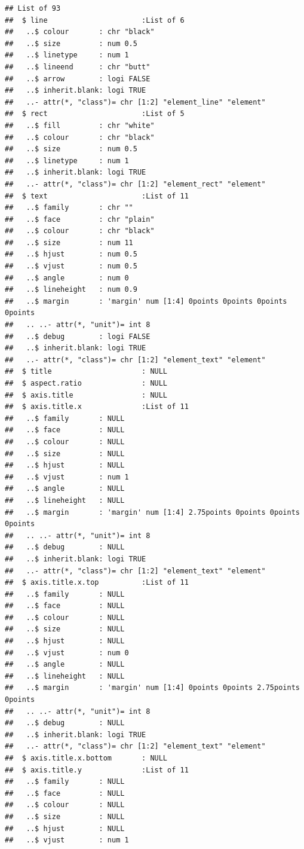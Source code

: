 \documentclass[
]{article}
\begin{document}
\begin{verbatim}
## List of 93
##  $ line                      :List of 6
##   ..$ colour       : chr "black"
##   ..$ size         : num 0.5
##   ..$ linetype     : num 1
##   ..$ lineend      : chr "butt"
##   ..$ arrow        : logi FALSE
##   ..$ inherit.blank: logi TRUE
##   ..- attr(*, "class")= chr [1:2] "element_line" "element"
##  $ rect                      :List of 5
##   ..$ fill         : chr "white"
##   ..$ colour       : chr "black"
##   ..$ size         : num 0.5
##   ..$ linetype     : num 1
##   ..$ inherit.blank: logi TRUE
##   ..- attr(*, "class")= chr [1:2] "element_rect" "element"
##  $ text                      :List of 11
##   ..$ family       : chr ""
##   ..$ face         : chr "plain"
##   ..$ colour       : chr "black"
##   ..$ size         : num 11
##   ..$ hjust        : num 0.5
##   ..$ vjust        : num 0.5
##   ..$ angle        : num 0
##   ..$ lineheight   : num 0.9
##   ..$ margin       : 'margin' num [1:4] 0points 0points 0points 0points
##   .. ..- attr(*, "unit")= int 8
##   ..$ debug        : logi FALSE
##   ..$ inherit.blank: logi TRUE
##   ..- attr(*, "class")= chr [1:2] "element_text" "element"
##  $ title                     : NULL
##  $ aspect.ratio              : NULL
##  $ axis.title                : NULL
##  $ axis.title.x              :List of 11
##   ..$ family       : NULL
##   ..$ face         : NULL
##   ..$ colour       : NULL
##   ..$ size         : NULL
##   ..$ hjust        : NULL
##   ..$ vjust        : num 1
##   ..$ angle        : NULL
##   ..$ lineheight   : NULL
##   ..$ margin       : 'margin' num [1:4] 2.75points 0points 0points 0points
##   .. ..- attr(*, "unit")= int 8
##   ..$ debug        : NULL
##   ..$ inherit.blank: logi TRUE
##   ..- attr(*, "class")= chr [1:2] "element_text" "element"
##  $ axis.title.x.top          :List of 11
##   ..$ family       : NULL
##   ..$ face         : NULL
##   ..$ colour       : NULL
##   ..$ size         : NULL
##   ..$ hjust        : NULL
##   ..$ vjust        : num 0
##   ..$ angle        : NULL
##   ..$ lineheight   : NULL
##   ..$ margin       : 'margin' num [1:4] 0points 0points 2.75points 0points
##   .. ..- attr(*, "unit")= int 8
##   ..$ debug        : NULL
##   ..$ inherit.blank: logi TRUE
##   ..- attr(*, "class")= chr [1:2] "element_text" "element"
##  $ axis.title.x.bottom       : NULL
##  $ axis.title.y              :List of 11
##   ..$ family       : NULL
##   ..$ face         : NULL
##   ..$ colour       : NULL
##   ..$ size         : NULL
##   ..$ hjust        : NULL
##   ..$ vjust        : num 1

\end{verbatim}
\end{document}
